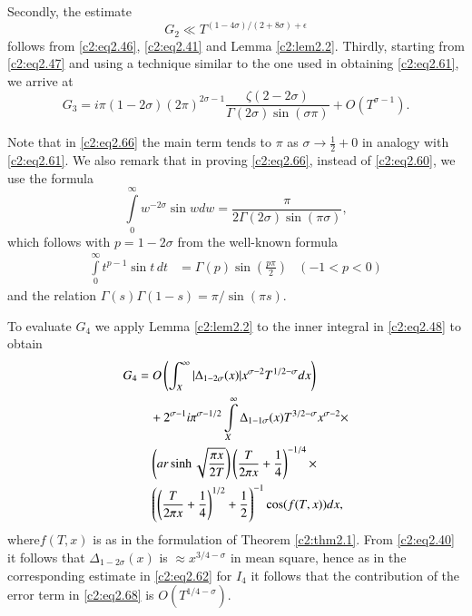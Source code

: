 Secondly, the estimate
$$
G_2 \ll T^{(1- 4 \sigma)/(2+ 8\sigma)+ \epsilon}
$$
follows from \eqref{c2:eq2.46}, \eqref{c2:eq2.41} and Lemma
\ref{c2:lem2.2}. Thirdly, starting from \eqref{c2:eq2.47} and using a
technique similar to the one used in obtaining \eqref{c2:eq2.61}, we
arrive at 
\begin{equation}
  G_3 = i \pi (1- 2 \sigma) (2 \pi)^{2 \sigma-1} \frac{\zeta (2 - 2
    \sigma)}{\Gamma (2 \sigma) \sin (\sigma \pi)} + O
  (T^{\sigma-1}).\label{c2:eq2.66} 
\end{equation}

Note that in \eqref{c2:eq2.66} the main term tends to $\pi$ as $\sigma
\to \frac{1}{2} +0$ in analogy with \eqref{c2:eq2.61}. We also remark
that in proving \eqref{c2:eq2.66}, instead of \eqref{c2:eq2.60}, we
use the formula
\begin{equation}
\label{c2:eq2.67}
\int\limits_0^\infty w^{- 2 \sigma} \sin w dw = \frac{\pi}{2 \Gamma (2
  \sigma) \sin (\pi \sigma)},
\end{equation}
which follows with $p=1-2 \sigma$ from the well-known formula
\begin{align*}
  \int\limits_0^\infty t^{p-1} \sin t\, dt & = \Gamma (p) \sin
  \left(\frac{p \pi}{2} \right) & (-1 < p < 0)
\end{align*}
and the relation $\Gamma (s) \Gamma (1-s) = \pi /\sin (\pi s)$.

To evaluate $G_4$ we apply Lemma \ref{c2:lem2.2} to the inner integral
in \eqref{c2:eq2.48} to obtain
\begin{align}
   G_4 & = O\left( \int_X^\infty | \Delta _{1- 2\sigma} (x)|
  x^{\sigma-2} T^{1/2 - \sigma} dx\right)\notag\\
 &\quad + 2^{\sigma -1} i \pi^{\sigma- 1/2} \int\limits_X^\infty
   \Delta _{1- 1 \sigma}(x) T^{3/2- \sigma} x^{\sigma -2}\times\notag\\ 
  &\quad\left(ar \sinh
  \sqrt{\frac{\pi x}{2 T}}\right) \left(\frac{T}{2 \pi x} +
  \frac{1}{4} \right)^{-1/4}\times \notag\\
  &\quad\left( \left( \frac{T}{2 \pi x} + \frac{1}{4}\right)^{1/2} +
  \frac{1}{2} \right)^{-1} \cos (f(T, x)) dx,\label{c2:eq2.68}
\end{align}
where\pageoriginale $f(T, x)$ is as in the formulation of Theorem
\ref{c2:thm2.1}. From \eqref{c2:eq2.40} it follows that $\Delta _{1-
  2 \sigma} (x)$ is $\approx x^{3/4 - \sigma}$ in mean square, hence
as in the corresponding estimate in \eqref{c2:eq2.62} for $I_4$ it
follows that the contribution of the error term in \eqref{c2:eq2.68}
is $O (T^{1/4 - \sigma})$.


